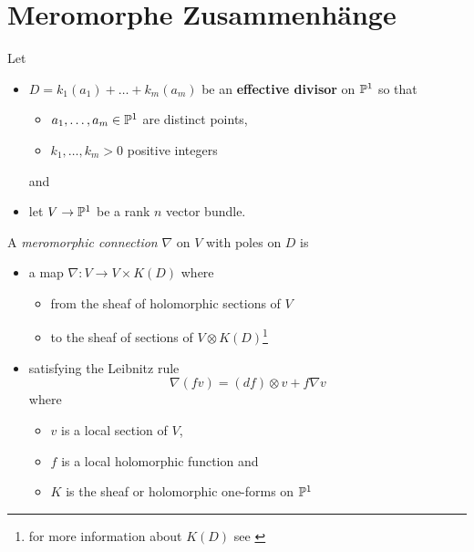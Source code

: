 \chapter{Meromorphe Zusammenhänge}
\begin{comment}
Siehe:
\begin{itemize}
  \item \cite{sabbah2007isomonodromic}
\end{itemize}
\end{comment}
Let
\begin{itemize}
  \item $D=k_1(a_1)+\dots+k_m(a_m)$ be an \textbf{effective divisor} on $\P^1$
    so that
    \begin{itemize}
      \item $a_1,\dots,a_m\in\P^1$ are distinct points,
      \item $k_1,\dots,k_m>0$ positive integers
    \end{itemize}
    and
  \item let $V\to\P^1$ be a rank $n$ vector bundle.
\end{itemize}
\begin{defn}[2.1]
  A \emph{meromorphic connection} $\nabla$ on $V$ with poles on $D$ is
  \begin{itemize}
    \item a map $\nabla:V\to V\times K(D)$ where
      \begin{itemize}
        \item from the sheaf of holomorphic sections of $V$
        \item to the sheaf of sections of $V\otimes K(D)$\footnote{for more
          information about $K(D)$ see \cite{beauville1996complex}}
      \end{itemize}
    \item satisfying the Leibnitz rule
      \begin{equation}
        \nabla(fv)=(df)\otimes v + f\nabla v
      \end{equation}
      where
      \begin{itemize}
        \item $v$ is a local section of $V$,
        \item $f$ is a local holomorphic function and
        \item $K$ is the sheaf or holomorphic one-forms on $\P^1$
      \end{itemize}
  \end{itemize}
\end{defn}

